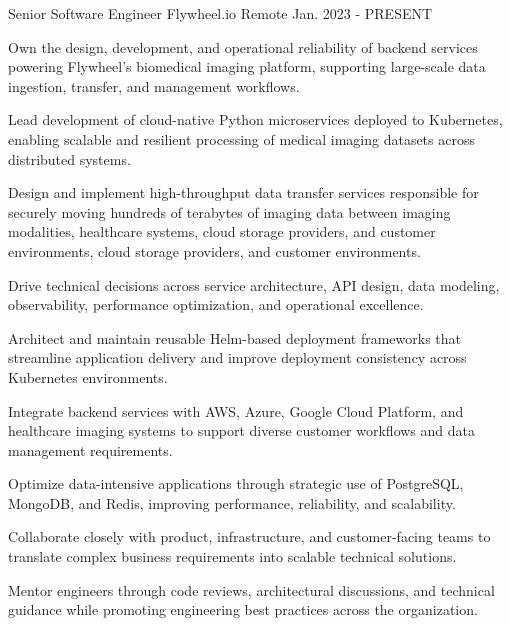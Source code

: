 

\begin{cventries}

  \cventry
    {Senior Software Engineer} %
    {Flywheel.io} %
    {Remote} %
    {Jan. 2023 - PRESENT} %
    {
      \begin{cvitems} %
        \item {Own the design, development, and operational reliability of backend services powering Flywheel's biomedical imaging platform, supporting large-scale data ingestion, transfer, and management workflows.}
        \item {Lead development of cloud-native Python microservices deployed to Kubernetes, enabling scalable and resilient processing of medical imaging datasets across distributed systems.}
        \item {Design and implement high-throughput data transfer services responsible for securely moving hundreds of terabytes of imaging data between imaging modalities, healthcare systems, cloud storage providers, and customer environments, cloud storage providers, and customer environments.}
        \item {Drive technical decisions across service architecture, API design, data modeling, observability, performance optimization, and operational excellence.}
        \item {Architect and maintain reusable Helm-based deployment frameworks that streamline application delivery and improve deployment consistency across Kubernetes environments.}
        \item {Integrate backend services with AWS, Azure, Google Cloud Platform, and healthcare imaging systems to support diverse customer workflows and data management requirements.}
        \item {Optimize data-intensive applications through strategic use of PostgreSQL, MongoDB, and Redis, improving performance, reliability, and scalability.}
        \item {Collaborate closely with product, infrastructure, and customer-facing teams to translate complex business requirements into scalable technical solutions.}
        \item {Mentor engineers through code reviews, architectural discussions, and technical guidance while promoting engineering best practices across the organization.}
      \end{cvitems}
    }


\end{cventries}
